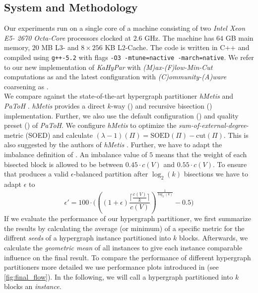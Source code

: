 \subsection{System and Methodology}
\label{sec:methodology}

Our experiments run on a single core of a machine consisting of two \emph{Intel Xeon E5-
2670 Octa-Core} processors clocked at $2.6$ GHz. The machine has $64$ GB main memory,
$20$ MB L$3$- and $8\times256$ KB L$2$-Cache. The code is written in C++ and compiled using
\lstinline{g++-5.2} with flags \lstinline{-O3 -mtune=nactive -march=native}. We refer to
our new implementation of \emph{KaHyPar} with \emph{(M)ax-(F)low-Min-Cut} computations 
as  and the latest configuration with \emph{(C)ommunity-(A)ware} coarsening as
. \\
We compare  against the state-of-the-art hypergraph partitioner \emph{hMetis} 
\cite{karypis1999multilevel,karypis2000multilevel} and \emph{PaToH} \cite{catalyurek1999hypergraph}.
\emph{hMetis} provides a direct $k$-way () and recursive bisection () implementation.
Further, we also use the default configuration () and quality preset () of
\emph{PaToH}. We configure \emph{hMetis} to optimize the \emph{sum-of-external-degree}-metric
(SOED) and calculate $(\lambda-1)(\Pi) = \text{SOED}(\Pi) - \text{cut}(\Pi)$. This is also
suggested by the authors of \emph{hMetis} \cite{karypis2000multilevel}. Further, we have
to adapt the imbalance definition of . An imbalance value of $5$ means that the weight
of each bisected block is allowed to be between $0.45 \cdot c(V)$ and $0.55 \cdot c(V)$.
To ensure that  produces a valid $\epsilon$-balanced partition after $\log_2(k)$
bisections we have to adapt $\epsilon$ to
\[\epsilon' = 100 \cdot \Bigg( \left( (1 + \epsilon) \frac{\lceil \frac{c(V)}{k} \rceil}{c(V)} \right)^{\frac{1}{\log_2(k)}} - 0.5 \Bigg)\]
If we evaluate the performance of our hypergraph partitioner,
we first summarize the results by calculating the average (or minimum) of a specific metric
for the diffrent \emph{seeds} of a hypergraph instance partitioned into $k$ blocks. 
Afterwards, we calculate the \emph{geometric mean} of 
all instances to give each instance comparable influence on the final result. 
To compare the performance of different hypergraph partitioners more detailed 
we use performance plots introduced in \cite{schlag2016k} (see \autoref{fig:final_flow}).
In the following, we will call a hypergraph partitioned into $k$ blocks an \emph{instance}.
